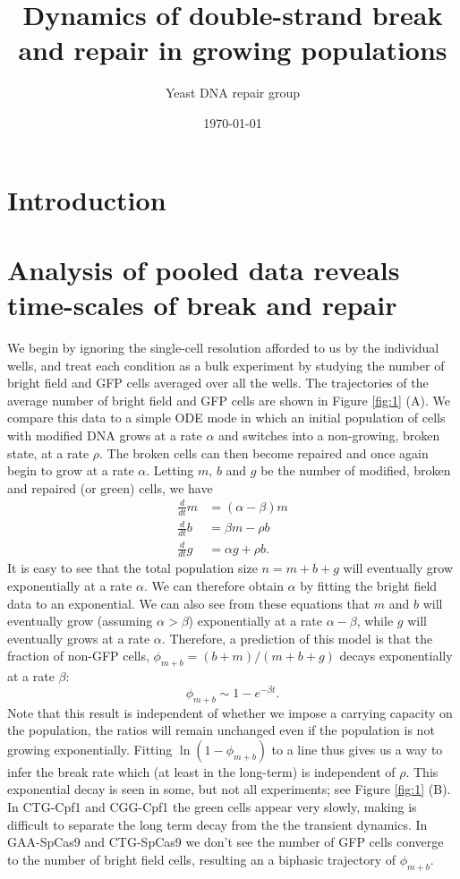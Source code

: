 \documentclass{article}
\author[1]{Yeast DNA repair group}
\title{Dynamics of double-strand break and repair in growing populations}
\date{\today}
\makeatletter
\renewcommand{\maketitle}{\bgroup\setlength{\parindent}{0pt}
\begin{flushleft}
  \textbf{\LARGE \@title}

  \@author
\end{flushleft}\egroup
}
\makeatother
\begin{document}
\maketitle
\tableofcontents

\section{Introduction}

\section{Analysis of pooled data reveals time-scales of break and repair}
We begin by ignoring the single-cell resolution afforded to us by the individual wells, and treat each condition as a bulk experiment by studying the number of bright field and GFP cells averaged over all the wells. The trajectories of the average number of bright field and GFP cells are shown in Figure \ref{fig:1} (A). We compare this data to a simple ODE mode in which an initial population of cells with modified DNA grows at a rate $\alpha$ and switches into a non-growing, broken state, at a rate $\rho$. The broken cells can then become repaired and once again begin to grow at a rate $\alpha$. Letting $m$, $b$ and $g$ be the number of modified, broken and repaired (or green) cells, we have
\begin{align}\label{mbg_ode}
\frac{d}{dt}m &= (\alpha - \beta) m\\
\frac{d}{dt}b &= \beta m - \rho b\\
\frac{d}{dt}g &= \alpha g + \rho b.
\end{align}
It is easy to see that the total population size $n = m+b+g$ will eventually grow exponentially at a rate $\alpha$. We can therefore obtain $\alpha$ by fitting the bright field data to an exponential. We can also see from these equations that $m$ and $b$ will eventually grow (assuming $\alpha> \beta$) exponentially at a rate $\alpha-\beta$, while $g$ will eventually grows at a rate $\alpha$. 
Therefore, a prediction of this model is that the fraction of  non-GFP cells, $\phi_{m+b} = (b+m)/(m+b+g)$  decays exponentially at a rate $\beta$:
\begin{equation}
\phi_{m+b} \sim 1- e^{-\beta t}. 
\end{equation}
Note that this result is independent of whether we impose a carrying capacity on the population, the ratios will remain unchanged even if the population is not growing exponentially. 
Fitting $\ln (1-\phi_{m+b})$ to a line thus gives us a way to infer the break rate which (at least in the long-term) is independent of $\rho$. 
This exponential decay is seen in some, but not all experiments; see Figure \ref{fig:1} (B). In CTG-Cpf1 and CGG-Cpf1 the green cells appear very slowly, making is difficult to separate the long term decay from the the transient dynamics. In GAA-SpCas9 and CTG-SpCas9 we don't see the number of GFP cells converge to the number of bright field cells, resulting an a biphasic trajectory of $\phi_{m+b}$. 
\end{document}
